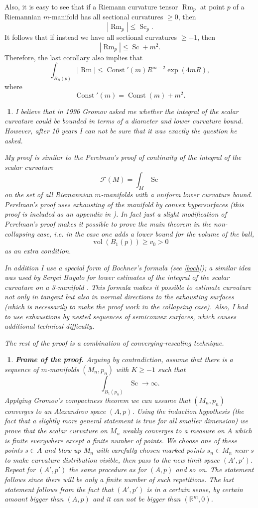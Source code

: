 \documentclass{article}
\def\RR{\mathbb{R}}
\def\ge{\geqslant}
\def\le{\leqslant}
\def\Const{\operatorname{Const}}
\def\vol{\operatorname{vol}}
\def\Rm{\operatorname{Rm}}
\def\Sc{\operatorname{Sc}}
\newtheorem{Nothing}[thm]{$\!\!\!$}
\newenvironment{nothing}{\begin{Nothing}\rm}{\end{Nothing}}
\begin{document}
Also, it is easy to see that if a Riemann curvature tensor $\Rm_p$ at point $p$ of a Riemannian $m$-manifold has all sectional curvatures
$\ge 0$, then
$$|\Rm_p|\le \Sc_p.$$
It follows that if instead we have all sectional curvatures
$\ge -1$, then
$$|\Rm_p|\le \Sc+m^2.$$
Therefore, the last corollary also implies that
$$\int_{B_R(p)}|\Rm|\le \Const'(m)R^{m-2}\exp(4m R),$$
where
$$\Const'(m)=\Const(m)+m^2.$$

\begin{nothing} I believe that in 1996 Gromov asked me whether the integral
of the scalar curvature could be bounded in terms of a diameter and lower curvature bound.
However, after 10 years I can not be sure that it was exactly the question he asked.

My proof is similar to the Perelman's proof of continuity of the integral of
the scalar curvature
$$\mathcal F(M)=\int_M \Sc$$
on the set of all Riemannian $m$-manifolds with a uniform lower curvature bound.
Perelman's proof uses exhausting of the manifold by convex hypersurfaces (this proof is included as an appendix in \cite{Pet}).
In fact just a slight modification of Perelman's proof makes it possible to prove
the main theorem in the non-collapsing case, i.e. in the case one adds a lower bound
for the volume of the ball, $$\vol(B_1(p))\ge v_0>0$$
as an extra condition.

In addition I use a special form of Bochner's formula (see \ref{boch});
a similar idea was used by Sergei Buyalo for lower estimates of
the integral of the scalar curvature on a 3-manifold \cite{Buy}.
This formula makes it possible to estimate curvature not only in tangent
but also in normal directions to the exhausting surfaces
(which is necessarily to make the proof work in the collapsing case).
Also, I had to use exhaustions by nested sequences of semiconvex surfaces,
which causes additional technical difficulty.

The rest of the proof is a combination of converging-rescaling technique.
\end{nothing}
\begin{nothing}{\bf Frame of the proof.}
Arguing by contradiction, assume that there is a sequence of $m$-manifolds $(M_n,p_n)$ with $K\ge -1$ such that $$\int_{B_1(p_n)}\Sc\to\infty.$$
Applying Gromov's compactness theorem we can assume that $(M_n,p_n)$ converges to an Alexandrov space $(A,p)$.
Using the induction hypothesis (the fact that a slightly more general statement
is true for all smaller dimension) we prove that the scalar curvature on $M_n$
weakly converges to a measure on $A$ which is finite everywhere except
a finite number of points.
We choose one of these points $s\in A$ and blow up $M_n$ with carefully chosen
marked points $s_n\in M_n$ near $s$ to make curvature distribution visible,
then pass to the new limit space $(A',p')$.
Repeat for $(A',p')$ the same procedure as for $(A,p)$ and so on.
The statement follows since there will be only a finite number of such repetitions.
The last statement follows from the fact that $(A',p')$ is in a certain sense,
by certain amount bigger than $(A,p)$ and it can not be bigger than $(\RR^m,0)$.
\end{nothing}
\end{document}
